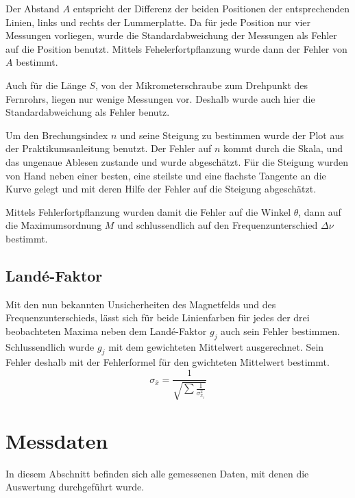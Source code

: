 \documentclass[a4paper,parskip,11pt, DIV12]{scrreprt}
\begin{document}
	Der Abstand $A$ entspricht der Differenz der beiden Positionen der entsprechenden Linien, links und rechts der Lummerplatte. Da für jede Position nur vier Messungen vorliegen, wurde die Standardabweichung der Messungen als Fehler auf die Position benutzt. Mittels Fehelerfortpflanzung wurde dann der Fehler von $A$ bestimmt.
	
	Auch für die Länge $S$, von der Mikrometerschraube zum Drehpunkt des Fernrohrs, liegen nur wenige Messungen vor. Deshalb wurde auch hier die Standardabweichung als Fehler benutz.
	
	Um den Brechungsindex $n$ und seine Steigung zu bestimmen wurde der Plot aus der Praktikumsanleitung benutzt. Der Fehler auf $n$ kommt durch die Skala, und das ungenaue Ablesen zustande und wurde abgeschätzt.
Für die Steigung wurden von Hand neben einer besten, eine steilste und eine flachste Tangente an die Kurve gelegt und mit deren Hilfe der Fehler auf die Steigung abgeschätzt.

	Mittels Fehlerfortpflanzung wurden damit die Fehler auf die Winkel $\theta$, dann auf die Maximumsordnung $M$ und schlussendlich auf den Frequenzunterschied $\Delta \nu$ bestimmt.
	
	\subsection{Landé-Faktor}
	
	Mit den nun bekannten Unsicherheiten des Magnetfelds und des Frequenzunterschieds, lässt sich für beide Linienfarben für jedes der drei beobachteten Maxima neben dem Landé-Faktor $g_j$ auch sein Fehler bestimmen. Schlussendlich wurde $g_j$ mit dem gewichteten Mittelwert ausgerechnet. Sein Fehler deshalb mit der Fehlerformel für den gwichteten Mittelwert bestimmt. 
	\begin{equation}
	\label{Fehler gewichteter Mittelwert}
	\sigma_{\bar{x}} = \frac{1}{\sqrt{\sum \frac{1}{\sigma_{x_i}^2}}}
	\end{equation}
	

	
	
	\section{Messdaten}
	In diesem Abschnitt befinden sich alle gemessenen Daten, mit denen die Auswertung durchgeführt wurde.
	
\end{document}
